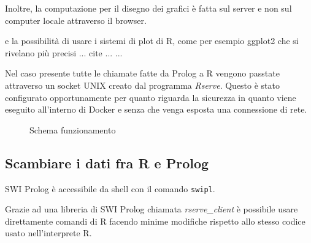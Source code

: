 \documentclass[10pt,titlepage,twoside,a4paper]{report}
\newenvironment{code}{\singlespacing\captionsetup{type=listing}}{}
\begin{document}
Inoltre, la computazione per il disegno dei grafici è fatta sul server e non 
sul computer locale attraverso il browser.
 
e la possibilità di usare i sistemi di plot di R, come per esempio ggplot2 
che si rivelano più precisi ... cite ... ...

Nel caso presente tutte le chiamate fatte da Prolog a R vengono passtate 
attraverso un socket UNIX creato dal programma \emph{Rserve}\cite{rserve}. 
Questo è stato configurato opportunamente per quanto riguarda la sicurezza 
in quanto viene eseguito all'interno di Docker e senza che venga esposta una 
connessione di rete.

\begin{figure}[H]
\centering
\caption{Schema funzionamento}
\end{figure}

\begin{code}
    \caption{File di configurazione di Rserve}
\end{code}

\subsection{Scambiare i dati fra R e Prolog}
SWI Prolog è accessibile da shell con il comando \texttt{swipl}.

Grazie ad una libreria di SWI Prolog chiamata 
\emph{rserve\_client}\cite{rserveclient} 
è possibile usare direttamente comandi di R facendo minime modifiche 
rispetto allo stesso codice usato nell'interprete R.
\end{document}
